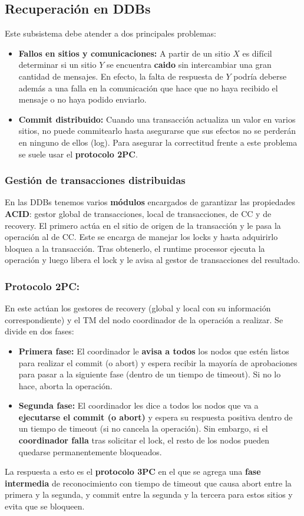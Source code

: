 \subsection*{Recuperación en DDBs}
Este subsistema debe atender a dos principales problemas:
\begin{itemize}
    \item \textbf{Fallos en sitios y comunicaciones:} A partir de un sitio $X$ es difícil determinar si un sitio $Y$ se encuentra \textbf{caido} sin intercambiar una gran cantidad de mensajes. En efecto, la falta de respuesta de $Y$ podría deberse además a una falla en la comunicación que hace que no haya recibido el mensaje o no haya podido enviarlo.
    \item \textbf{Commit distribuido:} Cuando una transacción actualiza un valor en varios sitios, no puede commitearlo hasta asegurarse que sus efectos no se perderán en ninguno de ellos (log). Para asegurar la correctitud frente a este problema se suele usar el \textbf{protocolo 2PC}.
\end{itemize}

\subsubsection*{Gestión de transacciones distribuidas}
En las DDBs tenemos varios \textbf{módulos} encargados de garantizar las propiedades \textbf{ACID}: gestor global de transacciones, local de transacciones, de CC y de recovery. El primero actúa en el sitio de origen de la transacción y le pasa la operación al de CC. Este se encarga de manejar los locks y hasta adquirirlo bloquea a la transacción. Tras obtenerlo, el runtime processor ejecuta la operación y luego libera el lock y le avisa al gestor de transacciones del resultado.

\subsubsection*{Protocolo 2PC:}
En este actúan los gestores de recovery (global y local con su información correspondiente) y el TM del nodo coordinador de la operación a realizar. Se divide en dos fases:
\begin{itemize}
    \item \textbf{Primera fase:} El coordinador le \textbf{avisa a todos} los nodos que estén listos para realizar el commit (o abort) y espera recibir la mayoría de aprobaciones para pasar a la siguiente fase (dentro de un tiempo de timeout). Si no lo hace, aborta la operación.
    \item \textbf{Segunda fase:} El coordinador les dice a todos los nodos que va a \textbf{ejecutarse el commit (o abort)} y espera su respuesta positiva dentro de un tiempo de timeout (si no cancela la operación). Sin embargo, si el \textbf{coordinador falla} tras solicitar el lock, el resto de los nodos pueden quedarse permanentemente bloqueados.
\end{itemize}
La respuesta a esto es el \textbf{protocolo 3PC} en el que se agrega una \textbf{fase intermedia} de reconocimiento con tiempo de timeout que causa abort entre la primera y la segunda, y commit entre la segunda y la tercera para estos sitios y evita que se bloqueen.

